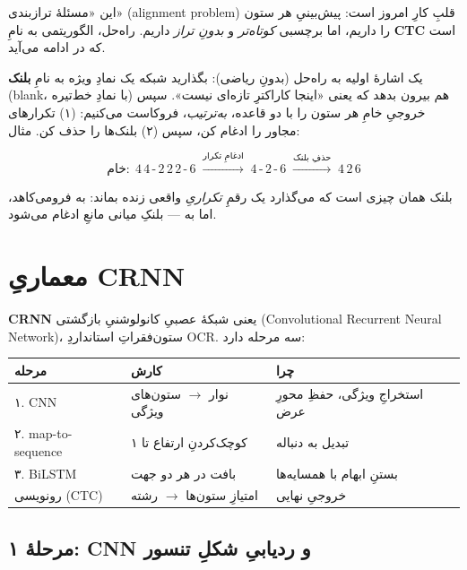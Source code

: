 \documentclass[12pt,a4paper]{article}
\begin{document}
\begin{nokte}
این «مسئلهٔ ترازبندی» (alignment problem) قلبِ کارِ امروز است: پیش‌بینیِ هر ستون را داریم، اما برچسبی \emph{کوتاه‌تر} و \emph{بدونِ تراز} داریم. راه‌حل، الگوریتمی به نامِ \textbf{CTC} است که در ادامه می‌آید.
\end{nokte}

یک اشارهٔ اولیه به راه‌حل (بدونِ ریاضی): بگذارید شبکه یک نمادِ ویژه به نامِ \textbf{بلنک} (blank، با نمادِ خط‌تیره) هم بیرون بدهد که یعنی «اینجا کاراکترِ تازه‌ای نیست». سپس خروجیِ خامِ هر ستون را با دو قاعده، \emph{به‌ترتیب}، فروکاست می‌کنیم: (۱) تکرارهای مجاور را ادغام کن، سپس (۲) بلنک‌ها را حذف کن. مثال:

\begin{riyazi}
\[
\text{خام:}\ \ 4\,4\,\text{-}\,2\,2\,2\,\text{-}\,6
\;\xrightarrow{\text{ادغامِ تکرار}}\;
4\,\text{-}\,2\,\text{-}\,6
\;\xrightarrow{\text{حذفِ بلنک}}\;
4\,2\,6
\]
\end{riyazi}

بلنک همان چیزی است که می‌گذارد یک رقمِ \emph{تکراریِ} واقعی زنده بماند:  به  فرومی‌کاهد، اما  به  — بلنکِ میانی مانعِ ادغام می‌شود.

\section{معماریِ CRNN}

\textbf{CRNN} یعنی شبکهٔ عصبیِ کانولوشنیِ بازگشتی (Convolutional Recurrent Neural Network)، ستون‌فقراتِ استانداردِ OCR. سه مرحله دارد:

\begin{center}
\begin{tabular}{@{}lll@{}}
\hline
\textbf{مرحله} & \textbf{کارش} & \textbf{چرا} \\
\hline
۱. CNN & نوار $\rightarrow$ ستون‌های ویژگی & استخراجِ ویژگی، حفظِ محورِ عرض \\
۲. map-to-sequence & کوچک‌کردنِ ارتفاع تا ۱ & تبدیل به دنباله \\
۳. BiLSTM & بافت در هر دو جهت & بستنِ ابهام با همسایه‌ها \\
رونویسی (CTC) & امتیازِ ستون‌ها $\rightarrow$ رشته & خروجیِ نهایی \\
\hline
\end{tabular}
\end{center}

\subsection{مرحلهٔ ۱: CNN و ردیابیِ شکلِ تنسور}
\end{document}
